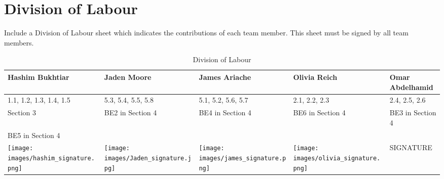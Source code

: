 \documentclass[]{article}
\begin{document}

\appendix
\section{Division of Labour}
\label{sec:division_of_labour}
Include a Division of Labour sheet which indicates the contributions of each team member. This sheet must be signed by all team members.

\begin{table}[h!]
\centering
\begin{tabular}{|p{3cm}|p{3cm}|p{3cm}|p{3cm}|p{3cm}|}
\hline
Hashim Bukhtiar & Jaden Moore & James Ariache & Olivia Reich & Omar Abdelhamid \\ \hline
1.1, 1.2, 1.3, 1.4, 1.5 & 5.3, 5.4, 5.5, 5.8 & 5.1, 5.2, 5.6, 5.7 & 2.1, 2.2, 2.3 & 2.4, 2.5, 2.6 \\ 
Section 3 & BE2 in Section 4 & BE4 in Section 4 & BE6 in Section 4 & BE3 in Section 4 \\ 
BE5 in Section 4 & & & & \\ \hline
\texttt{[image: images/hashim\_signature.png]} & \texttt{[image: images/Jaden\_signature.jpg]} &
\texttt{[image: images/james\_signature.png]}& \texttt{[image: images/olivia\_signature.png]} & SIGNATURE \\ \hline
\end{tabular}
\caption{Division of Labour}
\label{tab:division_of_labour}
\end{table}


\end{document}
